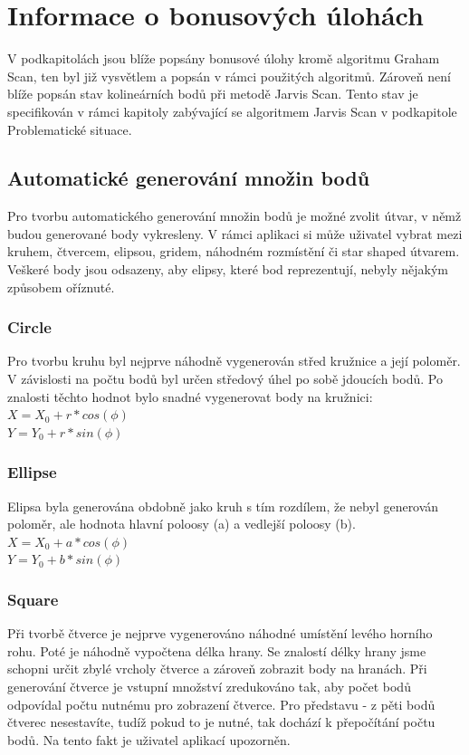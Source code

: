 \documentclass[a4paper, 12pt]{article}
\begin{document}
\section{Informace o bonusových úlohách}
V podkapitolách jsou blíže popsány bonusové úlohy kromě algoritmu Graham Scan, ten byl již vysvětlem a popsán v rámci použitých algoritmů. Zároveň není blíže popsán stav kolineárních bodů při metodě Jarvis Scan. Tento stav je specifikován v rámci kapitoly zabývající se algoritmem Jarvis Scan v podkapitole Problematické situace.

\subsection{Automatické generování množin bodů}
Pro tvorbu automatického generování množin bodů je možné zvolit útvar, v němž budou generované body vykresleny. V rámci aplikaci si může uživatel vybrat mezi kruhem, čtvercem, elipsou, gridem, náhodném rozmístění či star shaped útvarem. Veškeré body jsou odsazeny, aby elipsy, které bod reprezentují, nebyly nějakým způsobem oříznuté.

\subsubsection{Circle}
Pro tvorbu kruhu byl nejprve náhodně vygenerován střed kružnice a její poloměr. V závislosti na počtu bodů byl určen středový úhel po sobě jdoucích bodů. Po znalosti těchto hodnot bylo snadné vygenerovat body na kružnici:\\
$ X = X_0 + r * cos(\phi)$ \\
$ Y = Y_0 + r * sin(\phi) $

\subsubsection{Ellipse}
Elipsa byla generována obdobně jako kruh s tím rozdílem, že nebyl generován poloměr, ale hodnota hlavní poloosy (a) a vedlejší poloosy (b). 
$ X = X_0 + a * cos(\phi)$ \\
$ Y = Y_0 + b * sin(\phi) $

\subsubsection{Square}
Při tvorbě čtverce je nejprve vygenerováno náhodné umístění levého horního rohu. Poté je náhodně vypočtena délka hrany. Se znalostí délky hrany jsme schopni určit zbylé vrcholy čtverce a zároveň zobrazit body na hranách. Při generování čtverce je vstupní množství zredukováno tak, aby počet bodů odpovídal počtu nutnému pro zobrazení čtverce. Pro představu - z pěti bodů čtverec nesestavíte, tudíž pokud to je nutné, tak dochází k přepočítání počtu bodů. Na tento fakt je uživatel aplikací upozorněn.
\end{document}
